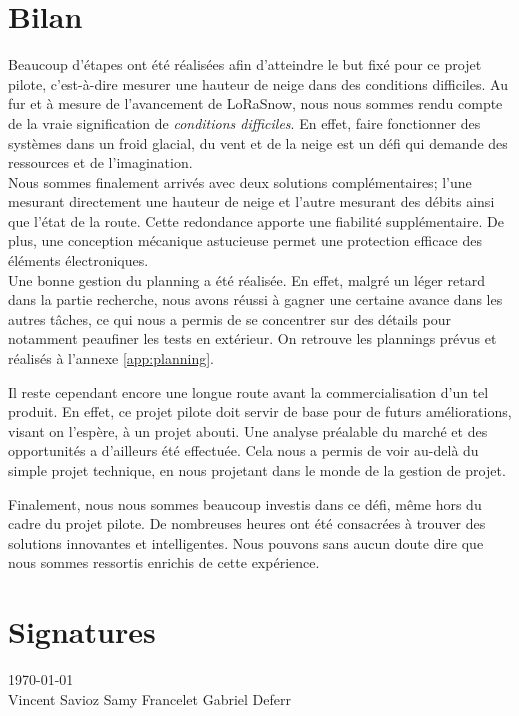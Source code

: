\section{Bilan}

Beaucoup d'étapes ont été réalisées afin d'atteindre le but fixé pour ce projet pilote, c'est-à-dire 
mesurer une hauteur de neige dans des conditions difficiles. Au fur et à mesure de l'avancement de LoRaSnow,
nous nous sommes rendu compte de la vraie signification de \emph{conditions difficiles}. En effet, faire 
fonctionner des systèmes dans un froid glacial, du vent et de la neige est un défi qui demande des
ressources et de l'imagination.\\
Nous sommes finalement arrivés avec deux solutions complémentaires; l'une mesurant directement une hauteur 
de neige et l'autre mesurant des débits ainsi que l'état de la route. Cette redondance apporte une fiabilité
supplémentaire. De plus, une conception mécanique astucieuse permet une protection efficace des éléments 
électroniques.\\
Une bonne gestion du planning a été réalisée. En effet, malgré un léger retard dans la partie
recherche, nous avons réussi à gagner une certaine avance dans les autres tâches, ce qui nous a permis de 
se concentrer sur des détails pour notamment peaufiner les tests en extérieur. On retrouve les plannings prévus et 
réalisés à l'annexe \ref{app:planning}.\par 
Il reste cependant encore une longue route avant la commercialisation d'un tel produit. En effet, ce projet 
pilote doit servir de base pour de futurs améliorations, visant on l'espère, à un projet abouti. Une analyse
préalable du marché et des opportunités a d'ailleurs été effectuée. Cela nous a permis de voir au-delà du
simple projet technique, en nous projetant dans le monde de la gestion de projet.\par 
Finalement, nous nous sommes beaucoup investis dans ce défi, même hors du cadre du projet pilote. De 
nombreuses heures ont été consacrées à trouver des solutions innovantes et intelligentes. Nous pouvons sans 
aucun doute dire que nous sommes ressortis enrichis de cette expérience.

\section{Signatures}
\noindent
\today\\ [1cm]
\vspace{\fill}
Vincent Savioz \hfill Samy Francelet \hfill Gabriel Deferr
\vspace{\fill}